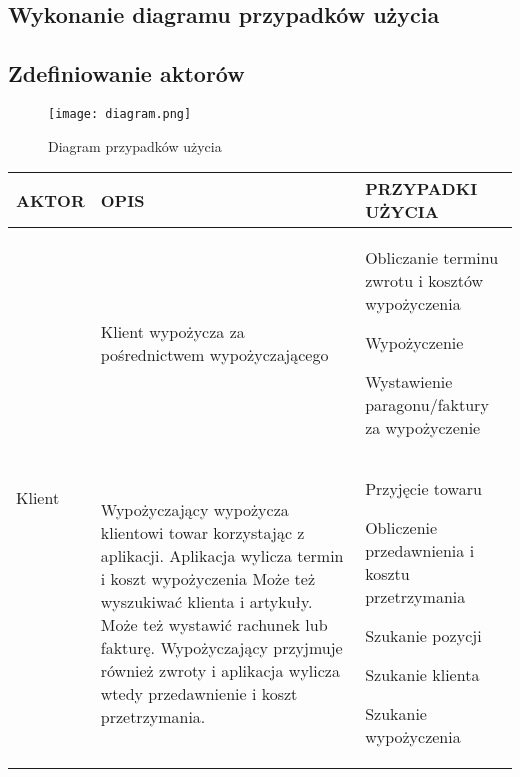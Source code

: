 \documentclass{article}
\begin{document}
	\subsection{Wykonanie diagramu przypadków użycia}
	\newpage
	\subsection{Zdefiniowanie aktorów}
\begin{figure}
	\centering
	\texttt{[image: diagram.png]}
	\caption{Diagram przypadków użycia}
	\label{fig:obrazek 1}
\end{figure}
\begin{tabular}{| p{} | p{6cm} | p{6cm} |} \hline 
	AKTOR & OPIS & PRZYPADKI UŻYCIA   \\ \hline
	\multirow{3}{*}{Klient} & Klient wypożycza za pośrednictwem wypożyczającego & 
	Obliczanie terminu zwrotu i kosztów wypożyczenia \par
	Wypożyczenie \par
	Wystawienie paragonu/faktury za wypożyczenie \\ 
	\hline
	\multirow{5}{*}{Wypożyczający} & Wypożyczający wypożycza klientowi towar korzystając z aplikacji.  Aplikacja wylicza termin i koszt wypożyczenia Może też wyszukiwać klienta i artykuły. Może też wystawić rachunek lub fakturę. Wypożyczający przyjmuje również zwroty i aplikacja wylicza wtedy przedawnienie i koszt przetrzymania. & Przyjęcie towaru\par
	Obliczenie przedawnienia i kosztu przetrzymania\par
	Szukanie pozycji\par
	Szukanie klienta\par
	Szukanie wypożyczenia \\ \hline
\end{tabular}
	\newpage
\end{document}
